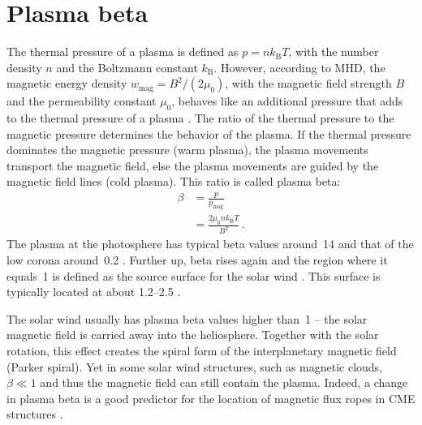 \section{Plasma beta}
\label{sec:plasma_beta}
The thermal pressure of a plasma is defined as $p = n k_\text{B} T$, with the number density $n$ and the Boltzmann constant $k_\text{B}$. However, according to MHD, the magnetic energy density $w_\text{mag} = B^2 / (2 \mu_0)$, with the magnetic field strength $B$ and the permeability constant $\mu_0$, behaves like an additional pressure that adds to the thermal pressure of a plasma \citep[p.~50]{Kivelson1995}. The ratio of the thermal pressure to the magnetic pressure determines the behavior of the plasma. If the thermal pressure dominates the magnetic pressure (warm plasma), the plasma movements transport the magnetic field, else the plasma movements are guided by the magnetic field lines (cold plasma). This ratio is called plasma beta:
\begin{align}
	\beta &= \frac{p}{p_\text{mag}}\\
	&= \frac{2 \mu_0 n k_\text{B} T}{B^2}	\,.	\nonumber
\end{align}
The plasma at the photosphere has typical beta values around~14 and that of the low corona around~0.2 \citep{Gary2001}. Further up, beta rises again and the region where it equals~1 is defined as the source surface for the solar wind \citep{Schatten1969}.	%
This surface is typically located at about \SIrange{1.2}{2.5}{\Rs} \citep{Gary2001}.

The solar wind usually has plasma beta values higher than~1 -- the solar magnetic field is carried away into the heliosphere. Together with the solar rotation, this effect creates the spiral form of the interplanetary magnetic field (Parker spiral). Yet in some solar wind structures, such as magnetic clouds, $\beta \ll 1$ and thus the magnetic field can still contain the plasma. Indeed, a change in plasma beta is a good predictor for the location of magnetic flux ropes in CME structures \citep{Riley2013,Savani2013}.



